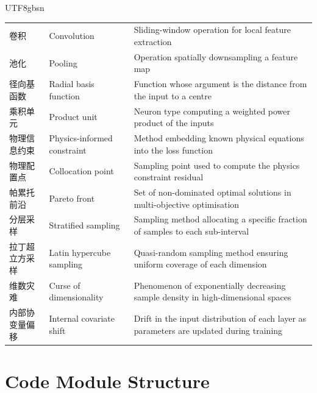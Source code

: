 \documentclass[a4paper,12pt]{report}
\begin{document}
\begin{CJK}{UTF8}{gbsn}
\begin{longtable}{p{3.5cm}lp{7cm}}
  卷积 & Convolution & Sliding-window operation for local feature extraction \\
  池化 & Pooling & Operation spatially downsampling a feature map \\
  径向基函数 & Radial basis function & Function whose argument is the distance from the input to a centre \\
  乘积单元 & Product unit & Neuron type computing a weighted power product of the inputs \\
  物理信息约束 & Physics-informed constraint & Method embedding known physical equations into the loss function \\
  物理配置点 & Collocation point & Sampling point used to compute the physics constraint residual \\
  帕累托前沿 & Pareto front & Set of non-dominated optimal solutions in multi-objective optimisation \\
  分层采样 & Stratified sampling & Sampling method allocating a specific fraction of samples to each sub-interval \\
  拉丁超立方采样 & Latin hypercube sampling & Quasi-random sampling method ensuring uniform coverage of each dimension \\
  维数灾难 & Curse of dimensionality & Phenomenon of exponentially decreasing sample density in high-dimensional spaces \\
  内部协变量偏移 & Internal covariate shift & Drift in the input distribution of each layer as parameters are updated during training \\
\end{longtable}

\chapter{Code Module Structure}
\label{app:code}


\end{CJK}
\end{document}
